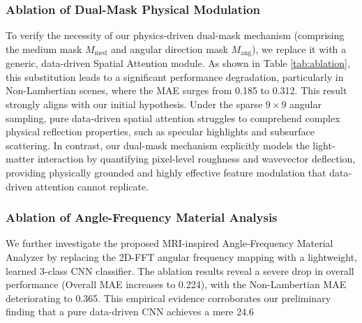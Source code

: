 \documentclass[journal]{IEEEtran}
\begin{document}
\subsubsection{Ablation of Dual-Mask Physical Modulation}
To verify the necessity of our physics-driven dual-mask mechanism (comprising the medium mask $M_{\text{med}}$ and angular direction mask $M_{\text{ang}}$), we replace it with a generic, data-driven Spatial Attention module. As shown in Table \ref{tab:ablation}, this substitution leads to a significant performance degradation, particularly in Non-Lambertian scenes, where the MAE surges from 0.185 to 0.312. This result strongly aligns with our initial hypothesis. Under the sparse $9 \times 9$ angular sampling, pure data-driven spatial attention struggles to comprehend complex physical reflection properties, such as specular highlights and subsurface scattering. In contrast, our dual-mask mechanism explicitly models the light-matter interaction by quantifying pixel-level roughness and wavevector deflection, providing physically grounded and highly effective feature modulation that data-driven attention cannot replicate.

\subsubsection{Ablation of Angle-Frequency Material Analysis}
We further investigate the proposed MRI-inspired Angle-Frequency Material Analyzer by replacing the 2D-FFT angular frequency mapping with a lightweight, learned 3-class CNN classifier. The ablation results reveal a severe drop in overall performance (Overall MAE increases to 0.224), with the Non-Lambertian MAE deteriorating to 0.365. This empirical evidence corroborates our preliminary finding that a pure data-driven CNN achieves a mere 24.6\\%
\end{document}
